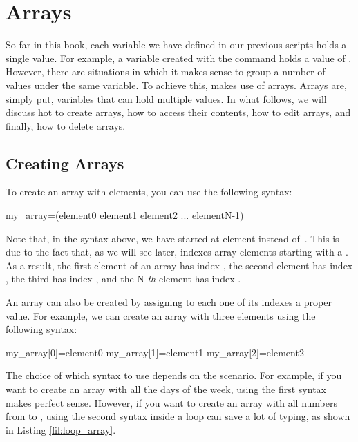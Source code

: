 \chapter{Arrays}\label{ch:arrays}

So far in this book, each variable we have defined in our previous scripts holds a single value. For example, a variable  created with the command  holds a value of . However, there are situations in which it makes sense to group a number of values under the same variable. To achieve this,  makes use of arrays. Arrays are, simply put, variables that can hold multiple values. In what follows, we will discuss hot to create arrays, how to access their contents, how to edit arrays, and finally, how to delete arrays.

\section{Creating Arrays}

To create an array with  elements, you can use the following syntax:
\begin{command_line}
my_array=(element0 element1 element2 ... elementN-1)
\end{command_line}
Note that, in the syntax above, we have started at element  instead of~. This is due to the fact that, as we will see later,  indexes array elements starting with a . As a result, the first element of an array has index , the second element has index , the third has index , and the N-\textit{th} element has index .

An array can also be created by assigning to each one of its indexes a proper value. For example, we can create an array with three elements using the following syntax:
\begin{command_line}
my_array[0]=element0
my_array[1]=element1
my_array[2]=element2
\end{command_line}

The choice of which syntax to use depends on the scenario. For example, if you want to create an array with all the days of the week, using the first syntax makes perfect sense. However, if you want to create an array with all numbers from  to , using the second syntax inside a loop can save a lot of typing, as shown in Listing \ref{fil:loop_array}.

